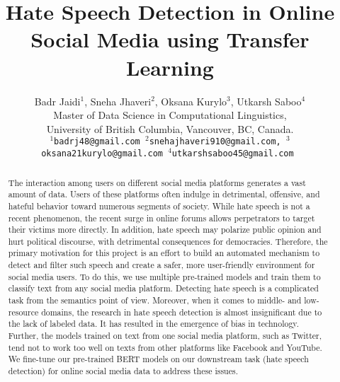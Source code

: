 \documentclass[a4paper, 10pt, conference]{IEEEtran}
\begin{document}
\title{Hate Speech Detection in Online Social Media using Transfer Learning}

\author{Badr Jaidi$^{1}$, Sneha Jhaveri$^{2}$, Oksana Kurylo$^{3}$, Utkarsh Saboo$^{4}$ \\ 
Master of Data Science in Computational Linguistics, \\University of British Columbia, Vancouver, BC, Canada.\\
{{\tt\small$^{1}$badrj48@gmail.com $^{2}$snehajhaveri910@gmail.com, $^{3}$oksana21kurylo@gmail.com $^{4}$utkarshsaboo45@gmail.com }}
}
\maketitle


{
\begin{abstract}
The interaction among users on different social media platforms generates a vast amount of data. Users of these platforms often indulge in detrimental, offensive, and hateful behavior toward numerous segments of society. While hate speech is not a recent phenomenon, the recent surge in online forums allows perpetrators to target their victims more directly. In addition, hate speech may polarize public opinion and hurt political discourse, with detrimental consequences for democracies. Therefore, the primary motivation for this project is an effort to build an automated mechanism to detect and filter such speech and create a safer, more user-friendly environment for social media users. To do this, we use multiple pre-trained models and train them to classify text from any social media platform.
Detecting hate speech is a complicated task from the semantics point of view. Moreover, when it comes to middle- and low-resource domains, the research in hate speech detection is almost insignificant due to the lack of labeled data. It has resulted in the emergence of bias in technology.
Further, the models trained on text from one social media platform, such as Twitter, tend not to work too well on texts from other platforms like Facebook and YouTube.
We fine-tune our pre-trained BERT models on our downstream task (hate speech detection) for online social media data to address these issues.
\end{abstract}}
\end{document}
